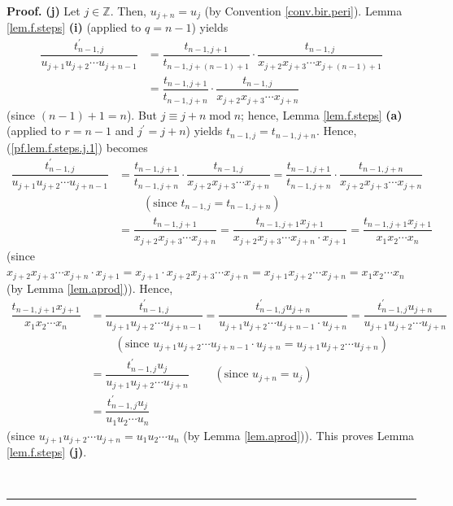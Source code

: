 \documentclass[numbers=enddot,12pt,final,onecolumn,notitlepage]{scrartcl}%
\theoremstyle{definition}
\newenvironment{proof}[1][Proof]{\noindent\textbf{#1.} }{\ \rule{0.5em}{0.5em}}
\begin{document}
\begin{proof}
\textbf{(j)} Let $j\in\mathbb{Z}$. Then, $u_{j+n}=u_{j}$ (by Convention
\ref{conv.bir.peri}). Lemma \ref{lem.f.steps} \textbf{(i)} (applied to
$q=n-1$) yields%
\begin{align}
\dfrac{t_{n-1,j}^{\prime}}{u_{j+1}u_{j+2}\cdots u_{j+n-1}}  &  =\dfrac
{t_{n-1,j+1}}{t_{n-1,j+\left(  n-1\right)  +1}}\cdot\dfrac{t_{n-1,j}}%
{x_{j+2}x_{j+3}\cdots x_{j+\left(  n-1\right)  +1}}\nonumber\\
&  =\dfrac{t_{n-1,j+1}}{t_{n-1,j+n}}\cdot\dfrac{t_{n-1,j}}{x_{j+2}%
x_{j+3}\cdots x_{j+n}} \label{pf.lem.f.steps.j.1}%
\end{align}
(since $\left(  n-1\right)  +1=n$). But $j\equiv j+n\operatorname{mod}n$;
hence, Lemma \ref{lem.f.steps} \textbf{(a)} (applied to $r=n-1$ and
$j^{\prime}=j+n$) yields $t_{n-1,j}=t_{n-1,j+n}$. Hence,
(\ref{pf.lem.f.steps.j.1}) becomes%
\begin{align*}
\dfrac{t_{n-1,j}^{\prime}}{u_{j+1}u_{j+2}\cdots u_{j+n-1}}  &  =\dfrac
{t_{n-1,j+1}}{t_{n-1,j+n}}\cdot\dfrac{t_{n-1,j}}{x_{j+2}x_{j+3}\cdots x_{j+n}%
}=\dfrac{t_{n-1,j+1}}{t_{n-1,j+n}}\cdot\dfrac{t_{n-1,j+n}}{x_{j+2}%
x_{j+3}\cdots x_{j+n}}\\
&  \ \ \ \ \ \ \ \ \ \ \left(  \text{since }t_{n-1,j}=t_{n-1,j+n}\right) \\
&  =\dfrac{t_{n-1,j+1}}{x_{j+2}x_{j+3}\cdots x_{j+n}}=\dfrac{t_{n-1,j+1}%
x_{j+1}}{x_{j+2}x_{j+3}\cdots x_{j+n}\cdot x_{j+1}}=\dfrac{t_{n-1,j+1}x_{j+1}%
}{x_{1}x_{2}\cdots x_{n}}%
\end{align*}
(since $x_{j+2}x_{j+3}\cdots x_{j+n}\cdot x_{j+1}=x_{j+1}\cdot x_{j+2}%
x_{j+3}\cdots x_{j+n}=x_{j+1}x_{j+2}\cdots x_{j+n}=x_{1}x_{2}\cdots x_{n}$ (by
Lemma \ref{lem.aprod})). Hence,%
\begin{align*}
\dfrac{t_{n-1,j+1}x_{j+1}}{x_{1}x_{2}\cdots x_{n}}  &  =\dfrac{t_{n-1,j}%
^{\prime}}{u_{j+1}u_{j+2}\cdots u_{j+n-1}}=\dfrac{t_{n-1,j}^{\prime}u_{j+n}%
}{u_{j+1}u_{j+2}\cdots u_{j+n-1}\cdot u_{j+n}}=\dfrac{t_{n-1,j}^{\prime
}u_{j+n}}{u_{j+1}u_{j+2}\cdots u_{j+n}}\\
&  \ \ \ \ \ \ \ \ \ \ \left(  \text{since }u_{j+1}u_{j+2}\cdots
u_{j+n-1}\cdot u_{j+n}=u_{j+1}u_{j+2}\cdots u_{j+n}\right) \\
&  =\dfrac{t_{n-1,j}^{\prime}u_{j}}{u_{j+1}u_{j+2}\cdots u_{j+n}%
}\ \ \ \ \ \ \ \ \ \ \left(  \text{since }u_{j+n}=u_{j}\right) \\
&  =\dfrac{t_{n-1,j}^{\prime}u_{j}}{u_{1}u_{2}\cdots u_{n}}%
\end{align*}
(since $u_{j+1}u_{j+2}\cdots u_{j+n}=u_{1}u_{2}\cdots u_{n}$ (by Lemma
\ref{lem.aprod})). This proves Lemma \ref{lem.f.steps} \textbf{(j)}.


\end{proof}
\end{document}

